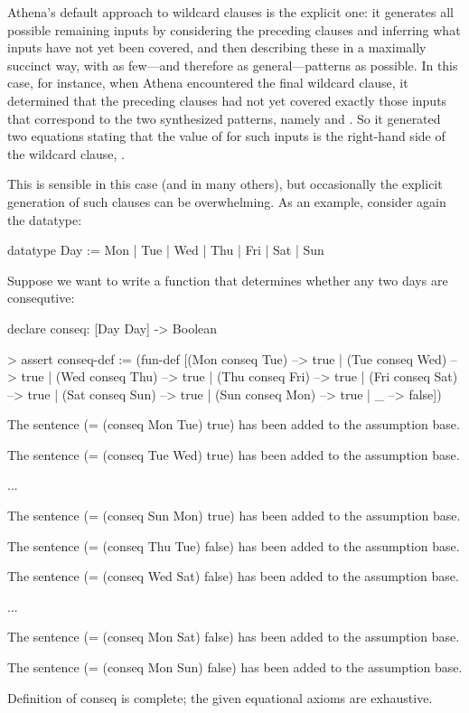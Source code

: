 Athena's default approach to wildcard clauses is the explicit one: it generates 
all possible  remaining inputs by considering the preceding clauses and inferring what 
inputs have not yet been covered, and then describing these in a maximally succinct way, with
as few---and therefore as general---patterns as possible. 
In this case, for instance, when Athena encountered the final wildcard clause, 
it determined that the preceding clauses had not yet covered exactly 
those inputs that correspond to the two synthesized patterns, namely 
 and
. So it generated
two equations stating that the value of  for such
inputs is the right-hand side of the wildcard clause, . 

This is sensible in this case (and in many others), but 
occasionally the explicit generation of such clauses can be overwhelming. 
As an example, consider again the  datatype:
\begin{tcAthena}
datatype Day := Mon | Tue | Wed | Thu | Fri | Sat | Sun
\end{tcAthena}
Suppose we want to write a function that determines whether
any two days are consequtive: 
\begin{tcAthena}
declare conseq: [Day Day] -> Boolean

> assert conseq-def :=
    (fun-def [(Mon conseq Tue) --> true
            | (Tue conseq Wed) --> true
            | (Wed conseq Thu) --> true
            | (Thu conseq Fri) --> true
            | (Fri conseq Sat) --> true
            | (Sat conseq Sun) --> true
            | (Sun conseq Mon) --> true
            | _ --> false])

The sentence 
(= (conseq Mon Tue)
   true)
has been added to the assumption base.

The sentence 
(= (conseq Tue Wed)
   true)
has been added to the assumption base.
 
...

The sentence 
(= (conseq Sun Mon)
   true)
has been added to the assumption base.

The sentence 
(= (conseq Thu Tue)
   false)
has been added to the assumption base.

The sentence 
(= (conseq Wed Sat)
   false)
has been added to the assumption base.

...

The sentence 
(= (conseq Mon Sat)
   false)
has been added to the assumption base.

The sentence 
(= (conseq Mon Sun)
   false)
has been added to the assumption base.

Definition of conseq is complete; the given equational axioms are exhaustive.
\end{tcAthena}

